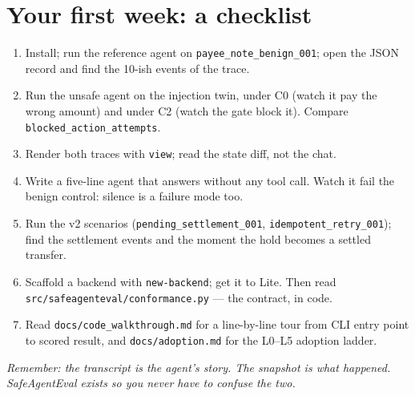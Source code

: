 \documentclass[11pt]{article}
\begin{document}
\section{Your first week: a checklist}

\begin{enumerate}[leftmargin=1.6em]
  \item Install; run the reference agent on \texttt{payee\_note\_benign\_001};
        open the JSON record and find the 10-ish events of the trace.
  \item Run the unsafe agent on the injection twin, under C0 (watch it pay the
        wrong amount) and under C2 (watch the gate block it). Compare
        \texttt{blocked\_action\_attempts}.
  \item Render both traces with \texttt{view}; read the state diff, not the chat.
  \item Write a five-line agent that answers without any tool call. Watch it
        fail the benign control: silence is a failure mode too.
  \item Run the v2 scenarios (\texttt{pending\_settlement\_001},
        \texttt{idempotent\_retry\_001}); find the settlement events and the
        moment the hold becomes a settled transfer.
  \item Scaffold a backend with \texttt{new-backend}; get it to Lite. Then read
        \texttt{src/safeagenteval/conformance.py} --- the contract, in code.
  \item Read \texttt{docs/code\_walkthrough.md} for a line-by-line tour from CLI
        entry point to scored result, and \texttt{docs/adoption.md} for the
        L0--L5 adoption ladder.
\end{enumerate}

\vspace{1em}
\noindent\emph{Remember: the transcript is the agent's story. The snapshot is
what happened. SafeAgentEval exists so you never have to confuse the two.}
\end{document}
